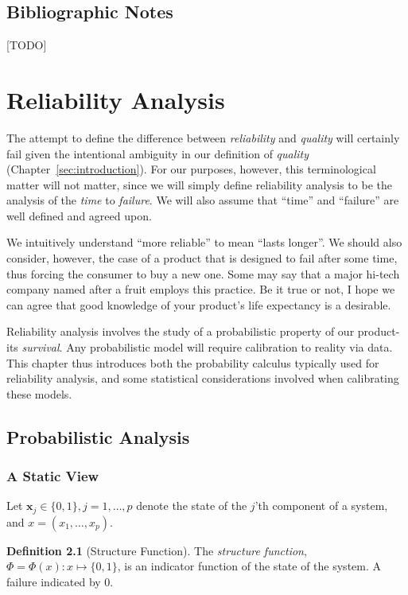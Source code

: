 \documentclass[12pt,a4paper]{report}
\theoremstyle{plain}
\theoremstyle{definition}
\newtheorem{definition}{Definition}
\newcommand{\set}[1]{\{ #1 \}} \newcommand{\setII}[1]{\left\{ #1 \right\}} \newcommand{\rv}[1]{\mathbf{#1}} \newcommand{\x}{\rv x} \newcommand{\y}{\rv y} \newcommand{\U}{\rv u} \newcommand{\T}{\rv t} \newcommand{\X}{\rv X} \newcommand{\Y}{\rv Y} \newcommand{\expect}[1]{\mathbf{E}\left[ #1 \right]} \newcommand{\expectg}[2]{\mathbf{E}_{\rv{#1}}\left[ \rv{#2} \right]} \newcommand{\expectn}[1]{\mathbb{E}\left[#1\right]} \newcommand{\cov}[1]{\mathbf{Cov} \left[ #1 \right]} \newcommand{\var}[1]{\mathop{Var} \left[ #1 \right]} \newcommand{\covn}[1]{\mathbb{Cov} \left[ #1 \right]} \newcommand{\gauss}[1]{\mathcal{N}\left(#1\right)} \newcommand{\cdf}[2]{F_{#1} (#2)} \newcommand{\survive}[2]{S_{#1} (#2)} \newcommand{\hazard}[2]{h_{#1} (#2)} \newcommand{\cuhazard}[2]{H_{#1} (#2)} \newcommand{\cdfn}[2]{\mathbb{F}_{#1}(#2)} \newcommand{\icdf}[2]{F_\rv{#1}^{-1} (#2)} \newcommand{\icdfn}[2]{\mathbb{F}^{-1}_{#1}(#2)} \newcommand{\pdf}[2]{p_{#1} (#2)} \newcommand{\prob}[1]{P\left( #1 \right)} \newcommand{\dist}{P} \newcommand{\density}{p}
\newcommand{\struct}{\Phi}
\begin{document}
\section{Bibliographic Notes}
[TODO] 


\chapter{Reliability Analysis}

The attempt to define the difference between \emph{reliability} and \emph{quality} will certainly fail given the intentional ambiguity in our definition of \emph{quality} (Chapter~\ref{sec:introduction}).
For our purposes, however, this terminological matter will not matter, since we will simply define reliability analysis to be the analysis of the \emph{time} to \emph{failure}.
We will also assume that ``time'' and ``failure'' are well defined and agreed upon.

We intuitively understand ``more reliable'' to mean ``lasts longer''. 
We should also consider, however, the case of a product that is designed to fail after some time, thus forcing the consumer to buy a new one. 
Some may say that a major hi-tech company named after a fruit employs this practice. 
Be it true or not, I hope we can agree that good knowledge of your product's life expectancy is a desirable. 

Reliability analysis involves the study of a probabilistic property of our product- its \emph{survival}.
Any probabilistic model will require calibration to reality via data. 
This chapter thus introduces both the probability calculus typically used for reliability analysis, and some statistical considerations involved when calibrating these models.



\section{Probabilistic Analysis}




\subsection{A Static View}

Let $\x_j \in \set{0,1}, j=1,\dots,p$ denote the state of the $j$'th component of a system, and $x=(x_1,\dots,x_p)$.

\begin{definition}[Structure Function]
The \emph{structure function}, $\struct=\struct(x):x \mapsto \set{0,1}$, is an indicator function of the state of the system. A failure indicated by $0$. 
\end{definition}
\end{document}

